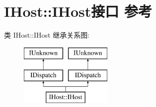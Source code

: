 \hypertarget{interface_i_host_1_1_i_host}{}\section{I\+Host\+:\+:I\+Host接口 参考}
\label{interface_i_host_1_1_i_host}
类 I\+Host\+:\+:I\+Host 继承关系图\+:\begin{figure}[H]
\begin{center}
\leavevmode
\includegraphics[height=3.000000cm]{interface_i_host_1_1_i_host}
\end{center}
\end{figure}
